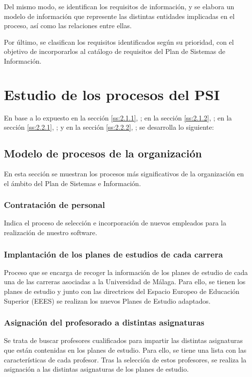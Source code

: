 \documentclass[11pt,a4paper,spanish,twoside]{report}
\begin{document}
Del mismo modo, se identifican los requisitos de información, y
se elabora un modelo de información que represente las distintas entidades
implicadas en el proceso, así como las relaciones entre ellas. 

Por último, se clasifican los requisitos identificados según su prioridad,
con el objetivo de incorporarlos al catálogo de requisitos del Plan de
Sistemas de Información. 

\section{Estudio de los procesos del PSI}
En base a lo expuesto 
en la sección \vref{ss:2.1.1}, \emph{}; 
en la sección \vref{ss:2.1.2}, \emph{}; 
en la sección \vref{ss:2.2.1}, \emph{}; y
en la sección \vref{ss:2.2.2}, \emph{}; 
se desarrolla lo siguiente:

\subsection{Modelo de procesos de la organización} \label{ss:4.1.1}
En esta sección se muestran los procesos más significativos de la
organización en el ámbito del Plan de Sistemas e Información.  

\subsubsection{Contratación de personal}
Indica el proceso de selección e incorporación de nuevos empleados para la
realización de nuestro software.

\subsubsection{Implantación de los planes de estudios de cada carrera}
Proceso que se encarga de recoger la información de los planes de estudio de
cada una de las carreras asociadas a la Universidad de Málaga. Para ello, se
tienen los planes de estudio y junto con las directrices del Espacio Europeo
de Educación Superior (EEES) se realizan los nuevos Planes de Estudio
adaptados.

\subsubsection{Asignación del profesorado a distintas asignaturas}
Se trata de buscar profesores cualificados para impartir las distintas
asignaturas que están contenidas en los planes de estudio. Para ello, se
tiene una lista con las características de cada profesor. Tras la selección
de estos profesores, se realiza la asignación a las distintas asignaturas de
los planes de estudio.
 
\end{document}
